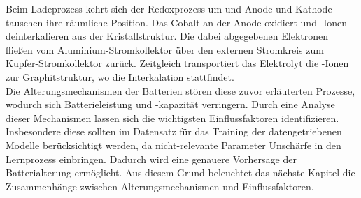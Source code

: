 Beim Ladeprozess kehrt sich der Redoxprozess um und Anode und Kathode tauschen ihre räumliche Position. Das Cobalt an der Anode oxidiert und -Ionen deinterkalieren aus der Kristallstruktur. Die dabei abgegebenen Elektronen fließen vom Aluminium-Stromkollektor über den externen Stromkreis zum Kupfer-Stromkollektor zurück. Zeitgleich transportiert das Elektrolyt die -Ionen zur Graphitstruktur, wo die Interkalation stattfindet.\\
Die Alterungsmechanismen der Batterien stören diese zuvor erläuterten Prozesse, wodurch sich Batterieleistung und -kapazität verringern. Durch eine Analyse dieser Mechanismen lassen sich die wichtigsten Einflussfaktoren identifizieren. Insbesondere diese sollten im Datensatz für das Training der datengetriebenen Modelle berücksichtigt werden, da nicht-relevante Parameter Unschärfe in den Lernprozess einbringen. Dadurch wird eine genauere Vorhersage der Batterialterung ermöglicht. Aus diesem Grund beleuchtet das nächste Kapitel die Zusammenhänge zwischen Alterungsmechanismen und Einflussfaktoren.

